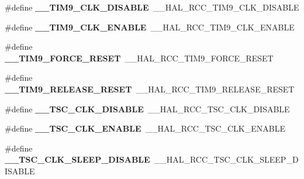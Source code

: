 \begin{DoxyCompactItemize}
\item 
\#define {\bfseries \+\_\+\+\_\+\+T\+I\+M9\+\_\+\+C\+L\+K\+\_\+\+D\+I\+S\+A\+B\+LE}~\+\_\+\+\_\+\+H\+A\+L\+\_\+\+R\+C\+C\+\_\+\+T\+I\+M9\+\_\+\+C\+L\+K\+\_\+\+D\+I\+S\+A\+B\+LE\hypertarget{group___h_a_l___r_c_c___aliased_ga64ffa78e1f919fc30de9d32ed533dc3c}{}\label{group___h_a_l___r_c_c___aliased_ga64ffa78e1f919fc30de9d32ed533dc3c}

\item 
\#define {\bfseries \+\_\+\+\_\+\+T\+I\+M9\+\_\+\+C\+L\+K\+\_\+\+E\+N\+A\+B\+LE}~\+\_\+\+\_\+\+H\+A\+L\+\_\+\+R\+C\+C\+\_\+\+T\+I\+M9\+\_\+\+C\+L\+K\+\_\+\+E\+N\+A\+B\+LE\hypertarget{group___h_a_l___r_c_c___aliased_gaf62dcd57ef37f2836c3f222e774d25a4}{}\label{group___h_a_l___r_c_c___aliased_gaf62dcd57ef37f2836c3f222e774d25a4}

\item 
\#define {\bfseries \+\_\+\+\_\+\+T\+I\+M9\+\_\+\+F\+O\+R\+C\+E\+\_\+\+R\+E\+S\+ET}~\+\_\+\+\_\+\+H\+A\+L\+\_\+\+R\+C\+C\+\_\+\+T\+I\+M9\+\_\+\+F\+O\+R\+C\+E\+\_\+\+R\+E\+S\+ET\hypertarget{group___h_a_l___r_c_c___aliased_ga81fb5cbbf251d0b3b42a650399f327f2}{}\label{group___h_a_l___r_c_c___aliased_ga81fb5cbbf251d0b3b42a650399f327f2}

\item 
\#define {\bfseries \+\_\+\+\_\+\+T\+I\+M9\+\_\+\+R\+E\+L\+E\+A\+S\+E\+\_\+\+R\+E\+S\+ET}~\+\_\+\+\_\+\+H\+A\+L\+\_\+\+R\+C\+C\+\_\+\+T\+I\+M9\+\_\+\+R\+E\+L\+E\+A\+S\+E\+\_\+\+R\+E\+S\+ET\hypertarget{group___h_a_l___r_c_c___aliased_gadd936f6a03bac25d239ce2111dd77048}{}\label{group___h_a_l___r_c_c___aliased_gadd936f6a03bac25d239ce2111dd77048}

\item 
\#define {\bfseries \+\_\+\+\_\+\+T\+S\+C\+\_\+\+C\+L\+K\+\_\+\+D\+I\+S\+A\+B\+LE}~\+\_\+\+\_\+\+H\+A\+L\+\_\+\+R\+C\+C\+\_\+\+T\+S\+C\+\_\+\+C\+L\+K\+\_\+\+D\+I\+S\+A\+B\+LE\hypertarget{group___h_a_l___r_c_c___aliased_ga9fd4d359940ac569114e5dd75e6ccef7}{}\label{group___h_a_l___r_c_c___aliased_ga9fd4d359940ac569114e5dd75e6ccef7}

\item 
\#define {\bfseries \+\_\+\+\_\+\+T\+S\+C\+\_\+\+C\+L\+K\+\_\+\+E\+N\+A\+B\+LE}~\+\_\+\+\_\+\+H\+A\+L\+\_\+\+R\+C\+C\+\_\+\+T\+S\+C\+\_\+\+C\+L\+K\+\_\+\+E\+N\+A\+B\+LE\hypertarget{group___h_a_l___r_c_c___aliased_gae675868b2ceace795fcc61e356cce397}{}\label{group___h_a_l___r_c_c___aliased_gae675868b2ceace795fcc61e356cce397}

\item 
\#define {\bfseries \+\_\+\+\_\+\+T\+S\+C\+\_\+\+C\+L\+K\+\_\+\+S\+L\+E\+E\+P\+\_\+\+D\+I\+S\+A\+B\+LE}~\+\_\+\+\_\+\+H\+A\+L\+\_\+\+R\+C\+C\+\_\+\+T\+S\+C\+\_\+\+C\+L\+K\+\_\+\+S\+L\+E\+E\+P\+\_\+\+D\+I\+S\+A\+B\+LE\hypertarget{group___h_a_l___r_c_c___aliased_gaae6ea218d3a94e736dfac2c2386c8189}{}\label{group___h_a_l___r_c_c___aliased_gaae6ea218d3a94e736dfac2c2386c8189}


\end{DoxyCompactItemize}
